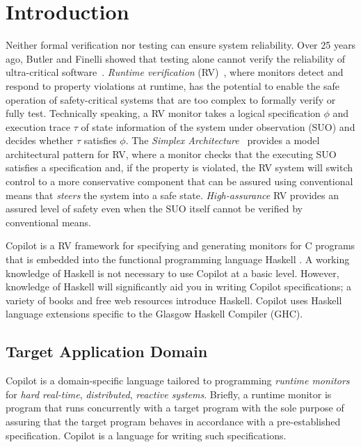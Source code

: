 
\section{Introduction} \label{sec:introduction}


Neither formal verification nor testing can ensure system reliability.
%
Over 25 years ago, Butler and Finelli showed that testing alone cannot verify
the reliability of ultra-critical software~\cite{butler}.
%
\emph{Runtime verification} (RV)~\cite{monitors}, where monitors detect and
respond to property violations at runtime, has the potential to enable the safe
operation of safety-critical systems that are too complex to formally verify or
fully test.
%
Technically speaking, a RV monitor takes a logical specification $\phi$ and
execution trace $\tau$ of state information of the system under observation
(SUO) and decides whether $\tau$ satisfies $\phi$.
%
The \emph{Simplex Architecture}~\cite{simplex} provides a model architectural
pattern for RV, where a monitor checks that the executing SUO satisfies a
specification and, if the property is violated, the RV system will switch
control to a more conservative component that can be assured using conventional
means that \emph{steers} the system into a safe state.
%
\emph{High-assurance} RV provides an assured level of safety even when the SUO
itself cannot be verified by conventional means.

Copilot is a RV framework for specifying and generating monitors for C programs
that is embedded into the functional programming language Haskell
\cite{PeytonJones02}.
%
 A working knowledge of Haskell is not necessary to use Copilot at a basic
level.
%
 However, knowledge of Haskell will significantly aid you in writing Copilot
specifications;  a variety of books and free web resources introduce Haskell.
%
  Copilot uses Haskell language extensions specific to the Glasgow Haskell
Compiler (GHC).

\subsection{Target Application Domain} \label{domain}


Copilot is a domain-specific language tailored to programming \emph{runtime
monitors} for \emph{hard real-time}, \emph{distributed}, \emph{reactive
systems}.
%
Briefly, a runtime monitor is program that runs concurrently with a target
program with the sole purpose of assuring that the target program behaves in
accordance with a pre-established specification.
%
 Copilot is a language for writing such specifications.
%

